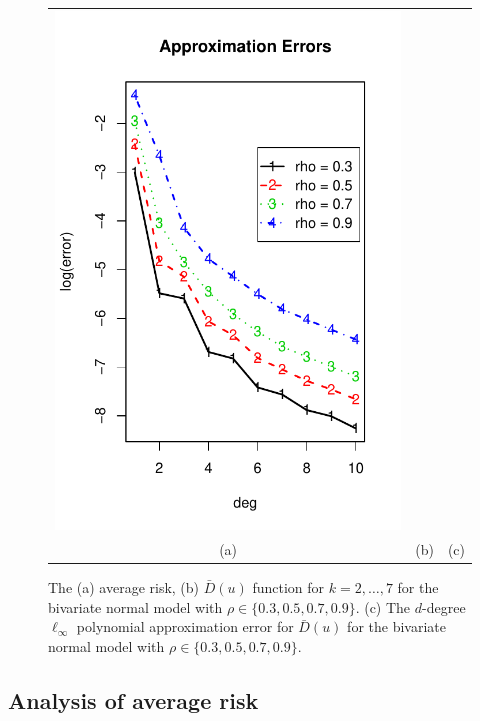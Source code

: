 \documentclass[12pt]{article}
\begin{document}
\begin{figure}[h]
\begin{tabular}{ccc}
\includegraphics[scale = 0.45, clip = true, trim = 0.05in 0 0.2in 0.6in]{illus_approx_errors.pdf}\\
(a) & (b) & (c)
\end{tabular}

\caption{
The (a) average risk, (b) $\bar{D}(u)$ function for $k = 2,\hdots, 7$ for the bivariate normal model with $\rho \in \{0.3, 0.5, 0.7, 0.9\}$.
(c) The $d$-degree $\ell_\infty$ polynomial approximation error for $\bar{D}(u)$ for the bivariate normal model with $\rho \in \{0.3, 0.5, 0.7, 0.9\}$.
}\label{fig:toy4}
\end{figure}

\subsection{Analysis of average risk}
\end{document}
